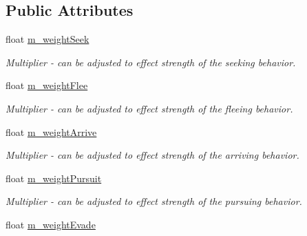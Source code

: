 \subsection*{Public Attributes}
\begin{DoxyCompactItemize}
\item 
\hypertarget{classsteer_1_1_super_component_aaced68de7b8442857e548a9a3c6db1e3}{float \hyperlink{classsteer_1_1_super_component_aaced68de7b8442857e548a9a3c6db1e3}{m\-\_\-weight\-Seek}}\label{classsteer_1_1_super_component_aaced68de7b8442857e548a9a3c6db1e3}

\begin{DoxyCompactList}\small\item\em Multiplier -\/ can be adjusted to effect strength of the seeking behavior. \end{DoxyCompactList}\item 
\hypertarget{classsteer_1_1_super_component_ac9472b29bf3a879877bb89904671a90a}{float \hyperlink{classsteer_1_1_super_component_ac9472b29bf3a879877bb89904671a90a}{m\-\_\-weight\-Flee}}\label{classsteer_1_1_super_component_ac9472b29bf3a879877bb89904671a90a}

\begin{DoxyCompactList}\small\item\em Multiplier -\/ can be adjusted to effect strength of the fleeing behavior. \end{DoxyCompactList}\item 
\hypertarget{classsteer_1_1_super_component_a17fd146cff611cfd6d01dafca41e454e}{float \hyperlink{classsteer_1_1_super_component_a17fd146cff611cfd6d01dafca41e454e}{m\-\_\-weight\-Arrive}}\label{classsteer_1_1_super_component_a17fd146cff611cfd6d01dafca41e454e}

\begin{DoxyCompactList}\small\item\em Multiplier -\/ can be adjusted to effect strength of the arriving behavior. \end{DoxyCompactList}\item 
\hypertarget{classsteer_1_1_super_component_a145b3e02c139711b4137c0270116a621}{float \hyperlink{classsteer_1_1_super_component_a145b3e02c139711b4137c0270116a621}{m\-\_\-weight\-Pursuit}}\label{classsteer_1_1_super_component_a145b3e02c139711b4137c0270116a621}

\begin{DoxyCompactList}\small\item\em Multiplier -\/ can be adjusted to effect strength of the pursuing behavior. \end{DoxyCompactList}\item 
\hypertarget{classsteer_1_1_super_component_ac5d3901b71460a9058237289148ec9b3}{float \hyperlink{classsteer_1_1_super_component_ac5d3901b71460a9058237289148ec9b3}{m\-\_\-weight\-Evade}}\label{classsteer_1_1_super_component_ac5d3901b71460a9058237289148ec9b3}


\end{DoxyCompactItemize}
